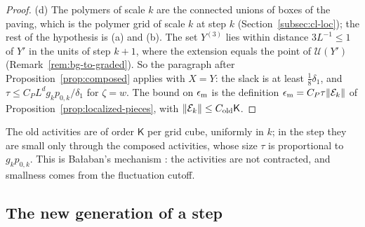\begin{proof}
(d) The polymers of scale $k$ are the connected unions of boxes of the paving, which is the polymer grid of scale $k$ at step $k$ (Section~\ref{subsec:cl-loc}); the rest of the hypothesis is (a) and (b). The set $Y^{(3)}$ lies within distance $3L^{-1}\le1$ of $Y'$ in the units of step $k+1$, where the extension equals the point of $\mathcal U(Y')$ (Remark~\ref{rem:bg-to-graded}). So the paragraph after Proposition~\ref{prop:composed} applies with $X=Y$: the slack is at least $\frac18\delta_1$, and $\tau\le C_PL^dg_kp_{0,k}/\delta_1$ for $\zeta=w$. The bound on $\epsilon_{\rm m}$ is the definition $\epsilon_{\rm m}=C_P\tau\|\mathcal E_k\|$ of Proposition~\ref{prop:localized-pieces}, with $\|\mathcal E_k\|\le C_{\rm old}\mathsf K$.
\end{proof}

The old activities are of order $\mathsf K$ per grid cube, uniformly in $k$; in the step they are small only through the composed activities, whose size $\tau$ is proportional to $g_kp_{0,k}$. This is Ba\l aban's mechanism \cite[(2.41)]{BalYM4II}: the activities are not contracted, and smallness comes from the fluctuation cutoff.

\subsection{The new generation of a step}\label{subsec:flow4-new}

